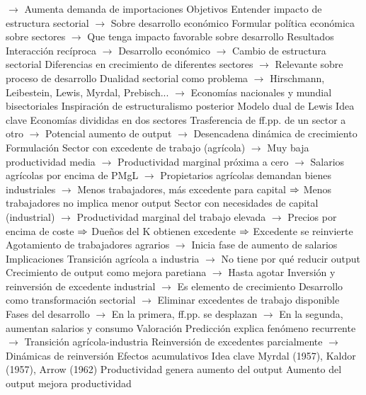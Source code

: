 \documentclass{nuevotema}
\begin{document}
\begin{esquemal}
				\4[] $\to$ Aumenta demanda de importaciones
				\4 Objetivos
				\4[] Entender impacto de estructura sectorial
				\4[] $\to$ Sobre desarrollo económico
				\4[] Formular política económica sobre sectores
				\4[] $\to$ Que tenga impacto favorable sobre desarrollo
				\4 Resultados
				\4[] Interacción recíproca
				\4[] $\to$ Desarrollo económico
				\4[] $\to$ Cambio de estructura sectorial
				\4[] Diferencias en crecimiento de diferentes sectores
				\4[] $\to$ Relevante sobre proceso de desarrollo
				\4[] Dualidad sectorial como problema
				\4[] $\to$ Hirschmann, Leibestein, Lewis, Myrdal, Prebisch...
				\4[] $\to$ Economías nacionales y mundial bisectoriales
				\4[] Inspiración de estructuralismo posterior
			\3 Modelo dual de Lewis
				\4 Idea clave
				\4[] Economías divididas en dos sectores
				\4[] Trasferencia de ff.pp. de un sector a otro
				\4[] $\to$ Potencial aumento de output
				\4[] $\to$ Desencadena dinámica de crecimiento
				\4 Formulación
				\4[] Sector con excedente de trabajo (agrícola)
				\4[] $\to$ Muy baja productividad media
				\4[] $\to$ Productividad marginal próxima a cero
				\4[] $\to$ Salarios agrícolas por encima de PMgL
				\4[] $\to$ Propietarios agrícolas demandan bienes industriales
				\4[] $\to$ Menos trabajadores, más excedente para capital
				\4[] $\Rightarrow$ Menos trabajadores no implica menor output
				\4[] Sector con necesidades de capital (industrial)
				\4[] $\to$ Productividad marginal del trabajo elevada
				\4[] $\to$ Precios por encima de coste
				\4[] $\Rightarrow$ Dueños del K obtienen excedente
				\4[] $\Rightarrow$ Excedente se reinvierte
				\4[] Agotamiento de trabajadores agrarios
				\4[] $\to$ Inicia fase de aumento de salarios
				\4 Implicaciones
				\4[] Transición agrícola a industria
				\4[] $\to$ No tiene por qué reducir output
				\4[] Crecimiento de output como mejora paretiana
				\4[] $\to$ Hasta agotar
				\4[] Inversión y reinversión de excedente industrial
				\4[] $\to$ Es elemento de crecimiento
				\4[] Desarrollo como transformación sectorial
				\4[] $\to$ Eliminar excedentes de trabajo disponible
				\4[] Fases del desarrollo
				\4[] $\to$ En la primera, ff.pp. se desplazan
				\4[] $\to$ En la segunda, aumentan salarios y consumo
				\4 Valoración
				\4[] Predicción explica fenómeno recurrente
				\4[] $\to$ Transición agrícola-industria
				\4[] Reinversión de excedentes parcialmente
				\4[] $\to$ Dinámicas de reinversión
		\2 Efectos acumulativos
			\3 Idea clave
				\4 Myrdal (1957), Kaldor (1957), Arrow (1962)
				\4 Productividad genera aumento del output
				\4[] Aumento del output mejora productividad

\end{esquemal}
\end{document}
